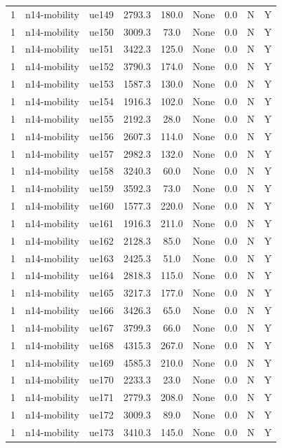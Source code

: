 \begin{table}[ht]
\begin{tabular}{|c|c|c|c|c|c|c|c|c|}
1 & n14-mobility & ue149 & 2793.3 & 180.0 & None & 0.0 & N & Y \\
1 & n14-mobility & ue150 & 3009.3 & 73.0 & None & 0.0 & N & Y \\
1 & n14-mobility & ue151 & 3422.3 & 125.0 & None & 0.0 & N & Y \\
1 & n14-mobility & ue152 & 3790.3 & 174.0 & None & 0.0 & N & Y \\
1 & n14-mobility & ue153 & 1587.3 & 130.0 & None & 0.0 & N & Y \\
1 & n14-mobility & ue154 & 1916.3 & 102.0 & None & 0.0 & N & Y \\
1 & n14-mobility & ue155 & 2192.3 & 28.0 & None & 0.0 & N & Y \\
1 & n14-mobility & ue156 & 2607.3 & 114.0 & None & 0.0 & N & Y \\
1 & n14-mobility & ue157 & 2982.3 & 132.0 & None & 0.0 & N & Y \\
1 & n14-mobility & ue158 & 3240.3 & 60.0 & None & 0.0 & N & Y \\
1 & n14-mobility & ue159 & 3592.3 & 73.0 & None & 0.0 & N & Y \\
1 & n14-mobility & ue160 & 1577.3 & 220.0 & None & 0.0 & N & Y \\
1 & n14-mobility & ue161 & 1916.3 & 211.0 & None & 0.0 & N & Y \\
1 & n14-mobility & ue162 & 2128.3 & 85.0 & None & 0.0 & N & Y \\
1 & n14-mobility & ue163 & 2425.3 & 51.0 & None & 0.0 & N & Y \\
1 & n14-mobility & ue164 & 2818.3 & 115.0 & None & 0.0 & N & Y \\
1 & n14-mobility & ue165 & 3217.3 & 177.0 & None & 0.0 & N & Y \\
1 & n14-mobility & ue166 & 3426.3 & 65.0 & None & 0.0 & N & Y \\
1 & n14-mobility & ue167 & 3799.3 & 66.0 & None & 0.0 & N & Y \\
1 & n14-mobility & ue168 & 4315.3 & 267.0 & None & 0.0 & N & Y \\
1 & n14-mobility & ue169 & 4585.3 & 210.0 & None & 0.0 & N & Y \\
1 & n14-mobility & ue170 & 2233.3 & 23.0 & None & 0.0 & N & Y \\
1 & n14-mobility & ue171 & 2779.3 & 208.0 & None & 0.0 & N & Y \\
1 & n14-mobility & ue172 & 3009.3 & 89.0 & None & 0.0 & N & Y \\
1 & n14-mobility & ue173 & 3410.3 & 145.0 & None & 0.0 & N & Y \\

\end{tabular}
\end{table}

